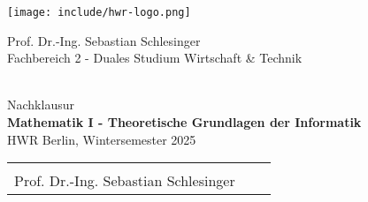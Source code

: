 \thispagestyle{scrplain}
\vspace*{-3cm}
\begin{minipage}[t][1.1cm][c]{4.5cm}
  \texttt{[image: include/hwr-logo.png]}
\end{minipage}
\hfill
\begin{minipage}[t][1.5cm][c]{8cm}
  \begin{center}
  \begin{footnotesize}
    \textsf{Prof. Dr.-Ing. Sebastian Schlesinger} \\[-0.1cm]
    \textsf{Fachbereich 2 - Duales Studium Wirtschaft \& Technik}
  \end{footnotesize}
  \end{center}
\end{minipage}
\hfill

\vspace*{-0.3cm}
\begin{center} 
  \hrulefill \\[0.1cm]
  {\large Nachklausur} \\[0.15cm]
  {\huge \bfseries Mathematik I - Theoretische Grundlagen der Informatik} \\[0.10cm]
  {HWR Berlin, Wintersemester 2025} \\[-0.4cm]
  \begin{tabular}{lcr}
    \hspace{0.3\textwidth}   & \hspace{0.3\textwidth} & \hspace{0.3\textwidth} \\
    Prof. Dr.-Ing. Sebastian Schlesinger   %
  \end{tabular} \\[0.1cm]
  \hrulefill
\end{center}